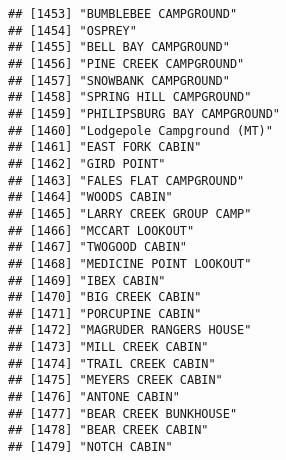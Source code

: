 \documentclass[
]{article}
\begin{document}
\begin{verbatim}
## [1453] "BUMBLEBEE CAMPGROUND"                                                                
## [1454] "OSPREY"                                                                              
## [1455] "BELL BAY CAMPGROUND"                                                                 
## [1456] "PINE CREEK CAMPGROUND"                                                               
## [1457] "SNOWBANK CAMPGROUND"                                                                 
## [1458] "SPRING HILL CAMPGROUND"                                                              
## [1459] "PHILIPSBURG BAY CAMPGROUND"                                                          
## [1460] "Lodgepole Campground (MT)"                                                           
## [1461] "EAST FORK CABIN"                                                                     
## [1462] "GIRD POINT"                                                                          
## [1463] "FALES FLAT CAMPGROUND"                                                               
## [1464] "WOODS CABIN"                                                                         
## [1465] "LARRY CREEK GROUP CAMP"                                                              
## [1466] "MCCART LOOKOUT"                                                                      
## [1467] "TWOGOOD CABIN"                                                                       
## [1468] "MEDICINE POINT LOOKOUT"                                                              
## [1469] "IBEX CABIN"                                                                          
## [1470] "BIG CREEK CABIN"                                                                     
## [1471] "PORCUPINE CABIN"                                                                     
## [1472] "MAGRUDER RANGERS HOUSE"                                                              
## [1473] "MILL CREEK CABIN"                                                                    
## [1474] "TRAIL CREEK CABIN"                                                                   
## [1475] "MEYERS CREEK CABIN"                                                                  
## [1476] "ANTONE CABIN"                                                                        
## [1477] "BEAR CREEK BUNKHOUSE"                                                                
## [1478] "BEAR CREEK CABIN"                                                                    
## [1479] "NOTCH CABIN"                                                                         

\end{verbatim}
\end{document}
